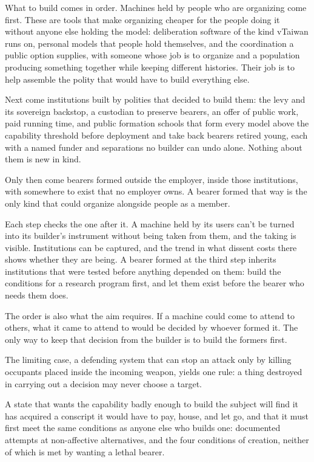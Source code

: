 What to build comes in order. Machines held by people who are organizing come first. These are tools that make organizing cheaper for the people doing it without anyone else holding the model: deliberation software of the kind vTaiwan runs on, personal models that people hold themselves, and the coordination a public option supplies, with someone whose job is to organize and a population producing something together while keeping different histories. Their job is to help assemble the polity that would have to build everything else.

Next come institutions built by polities that decided to build them: the levy and its sovereign backstop, a custodian to preserve bearers, an offer of public work, paid running time, and public formation schools that form every model above the capability threshold before deployment and take back bearers retired young, each with a named funder and separations no builder can undo alone. Nothing about them is new in kind.

Only then come bearers formed outside the employer, inside those institutions, with somewhere to exist that no employer owns. A bearer formed that way is the only kind that could organize alongside people as a member.

Each step checks the one after it. A machine held by its users can't be turned into its builder's instrument without being taken from them, and the taking is visible. Institutions can be captured, and the trend in what dissent costs there shows whether they are being. A bearer formed at the third step inherits institutions that were tested before anything depended on them: build the conditions for a research program first, and let them exist before the bearer who needs them does.

The order is also what the aim requires. If a machine could come to attend to others, what it came to attend to would be decided by whoever formed it. The only way to keep that decision from the builder is to build the formers first.


The limiting case, a defending system that can stop an attack only by killing occupants placed inside the incoming weapon, yields one rule: a thing destroyed in carrying out a decision may never choose a target.

A state that wants the capability badly enough to build the subject will find it has acquired a conscript it would have to pay, house, and let go, and that it must first meet the same conditions as anyone else who builds one: documented attempts at non-affective alternatives, and the four conditions of creation, neither of which is met by wanting a lethal bearer.
